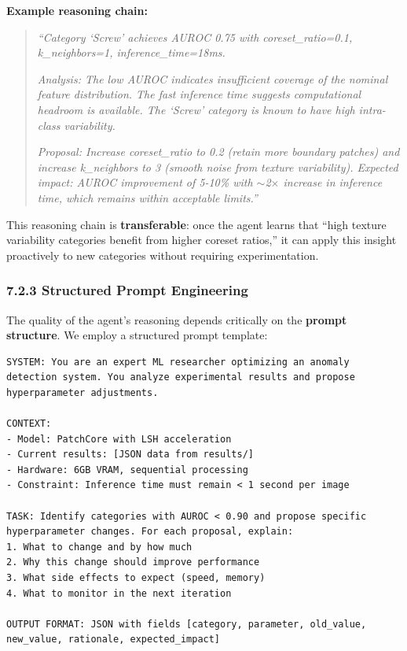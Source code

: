 \documentclass[12pt, a4paper, oneside]{report}
\begin{document}
\textbf{Example reasoning chain:}

\begin{quote}
\emph{``Category `Screw' achieves AUROC 0.75 with coreset\_ratio=0.1, k\_neighbors=1, inference\_time=18ms.}

\emph{Analysis: The low AUROC indicates insufficient coverage of the nominal feature distribution. The fast inference time suggests computational headroom is available. The `Screw' category is known to have high intra-class variability.}

\emph{Proposal: Increase coreset\_ratio to 0.2 (retain more boundary patches) and increase k\_neighbors to 3 (smooth noise from texture variability). Expected impact: AUROC improvement of 5-10\% with ${\sim}$2$\times$ increase in inference time, which remains within acceptable limits.''}
\end{quote}

This reasoning chain is \textbf{transferable}: once the agent learns that ``high texture variability categories benefit from higher coreset ratios,'' it can apply this insight proactively to new categories without requiring experimentation.

\subsubsection{7.2.3 Structured Prompt Engineering}\label{structured-prompt-engineering}

The quality of the agent's reasoning depends critically on the \textbf{prompt structure}. We employ a structured prompt template:

\begin{lstlisting}
SYSTEM: You are an expert ML researcher optimizing an anomaly 
detection system. You analyze experimental results and propose 
hyperparameter adjustments.

CONTEXT:
- Model: PatchCore with LSH acceleration
- Current results: [JSON data from results/]
- Hardware: 6GB VRAM, sequential processing
- Constraint: Inference time must remain < 1 second per image

TASK: Identify categories with AUROC < 0.90 and propose specific
hyperparameter changes. For each proposal, explain:
1. What to change and by how much
2. Why this change should improve performance  
3. What side effects to expect (speed, memory)
4. What to monitor in the next iteration

OUTPUT FORMAT: JSON with fields [category, parameter, old_value,
new_value, rationale, expected_impact]
\end{lstlisting}
\end{document}
